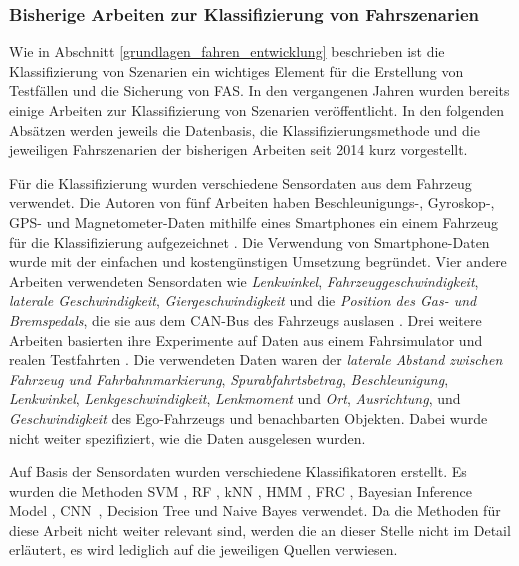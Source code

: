\subsubsection{Bisherige Arbeiten zur Klassifizierung von Fahrszenarien}

Wie in Abschnitt \ref{grundlagen_fahren_entwicklung} beschrieben ist die Klassifizierung von Szenarien ein wichtiges Element für die Erstellung von Testfällen und die Sicherung von \ac{FAS}. In den vergangenen Jahren wurden bereits einige Arbeiten zur Klassifizierung von Szenarien veröffentlicht. In den folgenden Absätzen werden jeweils die Datenbasis, die Klassifizierungsmethode und die jeweiligen Fahrszenarien der bisherigen Arbeiten seit 2014 kurz vorgestellt.

Für die Klassifizierung wurden verschiedene Sensordaten aus dem Fahrzeug verwendet. Die Autoren von fünf Arbeiten haben Beschleunigungs-, Gyroskop-, GPS- und Magnetometer-Daten mithilfe eines Smartphones ein einem Fahrzeug für die Klassifizierung aufgezeichnet \cite{xie2018driving, cervantes2016vehicle, woo2016manoeuvre, camlica2016feature, arroyo2016adaptive}. Die Verwendung von Smartphone-Daten wurde mit der einfachen und kostengünstigen Umsetzung begründet. Vier andere Arbeiten verwendeten Sensordaten wie \textit{Lenkwinkel}, \textit{Fahrzeuggeschwindigkeit}, \textit{laterale Geschwindigkeit}, \textit{Giergeschwindigkeit} und die \textit{Position des Gas- und Bremspedals}, die sie aus dem CAN-Bus des Fahrzeugs auslasen \cite{zheng2017lane, zheng2015non, li2015lane, zheng2014threshold}. Drei weitere Arbeiten basierten ihre Experimente auf Daten aus einem Fahrsimulator \cite{sun2017robust, zheng2016drivers} und realen Testfahrten \cite{gruner2017spatiotemporal}. Die verwendeten Daten waren der \textit{laterale Abstand zwischen Fahrzeug und Fahrbahnmarkierung}, \textit{Spurabfahrtsbetrag}, \textit{Beschleunigung}, \textit{Lenkwinkel}, \textit{Lenkgeschwindigkeit}, \textit{Lenkmoment} und \textit{Ort}, \textit{Ausrichtung}, und \textit{Geschwindigkeit} des Ego-Fahrzeugs und benachbarten Objekten. Dabei wurde nicht weiter spezifiziert, wie die Daten ausgelesen wurden.

Auf Basis der Sensordaten wurden verschiedene Klassifikatoren erstellt. Es wurden die Methoden \ac{SVM} \cite{sun2017robust, cervantes2016vehicle, woo2016manoeuvre, camlica2016feature, zheng2016drivers, zheng2015non}, \ac{RF} \cite{xie2018driving, cervantes2016vehicle, zheng2016drivers}, \ac{kNN} \cite{zheng2017lane, camlica2016feature, zheng2016drivers}, \ac{HMM} \cite{zheng2017lane, li2015lane}, \ac{FRC} \cite{cervantes2016vehicle, arroyo2016adaptive}, Bayesian Inference Model \cite{sun2017robust}, \ac{CNN} \cite{gruner2017spatiotemporal}, Decision Tree \cite{zheng2014threshold} und Naive Bayes \cite{camlica2016feature} verwendet. Da die Methoden für diese Arbeit nicht weiter relevant sind, werden die an dieser Stelle nicht im Detail erläutert, es wird lediglich auf die jeweiligen Quellen verwiesen.

